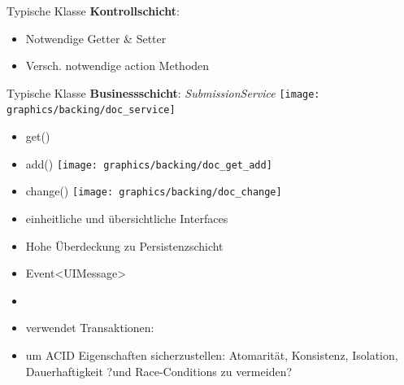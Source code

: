 \documentclass{beamer}
\begin{document}
\begin{frame}{Typische Klasse \textbf{Kontrollschicht}:}
\begin{itemize}
            \item Notwendige Getter & Setter %
            \item Versch. notwendige action Methoden %
        \end{itemize}
    \end{frame}


    \begin{frame}{Typische Klasse \textbf{Businessschicht}:}
        \emph{SubmissionService}
        \centering
        \texttt{[image: graphics/backing/doc\_service]}
        \pause
        \begin{itemize}
            \item get()
            \item add()
            \centering
            \texttt{[image: graphics/backing/doc\_get\_add]}
            \item change()
            \centering
            \texttt{[image: graphics/backing/doc\_change]}

            \item einheitliche und übersichtliche Interfaces
            \item Hohe Überdeckung zu Persistenzschicht

            \item Event<UIMessage>

            \item %
            \item verwendet Transaktionen:
            \item um ACID Eigenschaften sicherzustellen: Atomarität, Konsistenz, Isolation, Dauerhaftigkeit
            ?und Race-Conditions zu vermeiden?
        \end{itemize}
    \end{frame}
\end{document}
